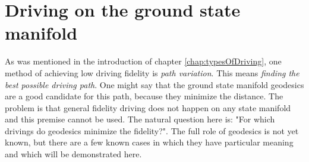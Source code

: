 























\section{Driving on the ground state manifold}
\label{chap:groundStateManifoldDriving}
As was mentioned in the introduction of chapter \ref{chap:typesOfDriving}, one method of achieving low driving fidelity is \emph{path variation}. This means \emph{finding the best possible driving path}. One might say that the ground state manifold geodesics are a good candidate for this path, because they minimize the distance. The problem is that general fidelity driving does not happen on any state manifold and this premise cannot be used. The natural question here is: "For which drivings do geodesics minimize the fidelity?". The full role of geodesics is not yet known, but there are a few known cases in which they have particular meaning and which will be demonstrated here.

